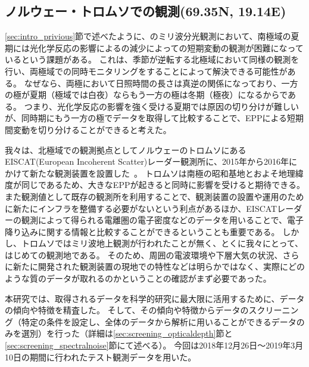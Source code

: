 \subsection{ノルウェー・トロムソでの観測(69.35\textdegree N, 19.14\textdegree E)}
\label{subsec:mm_tromsoe}
\ref{sec:intro_privious}節で述べたように、のミリ波分光観測において、南極域の夏期には光化学反応の影響によるの減少によっての短期変動の観測が困難になっているという課題がある。
これは、季節が逆転する北極域において同様の観測を行い、両極域での同時モニタリングをすることによって解決できる可能性がある。
なぜなら、両極において日照時間の長さは真逆の関係になっており、一方の極が夏期（極域では白夜）ならもう一方の極は冬期（極夜）になるからである。
つまり、光化学反応の影響を強く受ける夏期では原因の切り分けが難しいが、同時期にもう一方の極でデータを取得して比較することで、EPPによる短期間変動を切り分けることができると考えた。\par

我々は、北極域での観測拠点としてノルウェーのトロムソにあるEISCAT(European Incoherent Scatter)レーダー観測所に、2015年から2016年にかけて新たな観測装置を設置した~\cite{ito2017master}。
トロムソは南極の昭和基地とおよそ地理緯度が同じであるため、大きなEPPが起きると同時に影響を受けると期待できる。
また観測値として既存の観測所を利用することで、観測装置の設置や運用のために新たにインフラを整備する必要がないという利点があるほか、EISCATレーダーの観測によって得られる電離圏の電子密度などのデータを用いることで、電子降り込みに関する情報と比較することができるということも重要である。
しかし、トロムソではミリ波地上観測が行われたことが無く、とくに我々にとって、はじめての観測地である。
そのため、周囲の電波環境や下層大気の状況、さらに新たに開発された観測装置の現地での特性などは明らかではなく、実際にどのような質のデータが取れるのかということの確認がまず必要であった。\par

本研究では、取得されるデータを科学的研究に最大限に活用するために、データの傾向や特徴を精査した。
そして、その傾向や特徴からデータのスクリーニング（特定の条件を設定し、全体のデータから解析に用いることができるデータのみを選別）を行った（詳細は\ref{sec:screening_opticaldepth}節と\ref{sec:screening_spectralnoise}節にて述べる）。
今回は2018年12月26日〜2019年3月10日の期間に行われたテスト観測データを用いた。


